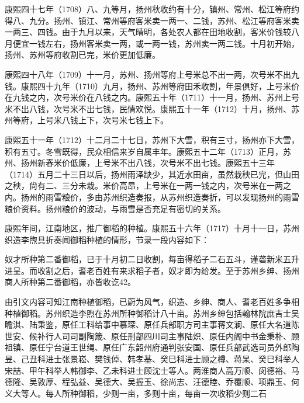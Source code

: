 康熙四十七年（1708）八、九等月，扬州秋收约有十分，镇州、常州、松江等府约得八、九分。扬州、镇江、常州等府客米卖一两一、二钱，苏州、松江等府客米卖一两三、四钱。由于九月以来，天气晴明，各处农人都在田地收割，客米价钱较八月便宜一钱左右，扬州客米卖一两，或一两一钱，苏州卖一两二钱。十月初开始，扬州、苏州等府收割已完，米价更加低廉。

\vfill
\begin{BookNotes}
\end{BookNotes}

康熙四十八年（1709）十一月，苏州、扬州等府上号米总不出一两，次号米不出九钱。康熙四十九年（1710）九月，扬州、苏州等府田禾收割，年景俱好，上号米价在九钱之内，次号米价在八钱之内。康熙五十年（1711）十一月，扬州、苏州上号米不出八钱，次号米不出七钱，民情欢悦。康熙五十一年（1712）十月，扬州、苏州等府，上号米八钱上下，次号米七钱上下。

康熙五十一年（1712）十二月二十七日，苏州下大雪，积有三寸，扬州亦下大雪，积有五寸。冬雪既得，民众相信来岁自属丰年。康熙五十二年（1713）正月，苏州、扬州新春米价低廉，上号米不出八钱，次号米不出七钱。康熙五十三年（1714）五月二十三日以后，扬州雨泽缺少，其近水田亩，虽然栽秧已完，但山田之秧，尙有二、三分未栽。米价高昂，上号米在一两一钱之内，次号米在一两之内。扬州的雨雪粮价，多由苏州织造奏报，从苏州织造奏折，可以发现扬州的雨雪粮价资料。扬州粮价的波动，与雨雪是否充足有密切的关系。

康熙年间，江南地区，推广御稻的种植。康熙五十六年（1717）十月十一日，苏州织造李煦具折奏闻御稻种植的情形，节录一段内容如下：

\begin{BookQuote}
奴才所种第二番御稻，已于十月初二日收割，每亩得稻子二石五斗，谨砻新米五升进呈。而收割之后，耆老百姓有来求稻子者，奴才即为给发。至于苏州乡绅、扬州商人所种第二番御稻，亦皆收讫42。
\end{BookQuote}

由引文内容可知江南种植御稻，已蔚为风气，织造、乡绅、商人、耆老百姓多争相种植御稻。苏州织造李煦在苏州所种御稻计八十亩。苏州乡绅包括翰林院庶吉士吴瞻淇、陆秉鉴，原任工科给事中慕琛、原任兵部职方司主事蒋文澜、原任大名道陈世安、候补行人司司副陶箴、原任刑部四川司主事陆炽、原任内阁中书金秉朴、顾祖镇、原任宁台道王世绳、原任广东韶州府通判张安国、原任兵部武选司员外郎陶昱、己丑科进士张景崧、樊钱倬、韩孝基、癸巳科进士顾之樽、蒋杲、癸巳科举人宋喆、甲午科举人韩御李、乙未科进士顾沈士等人。两淮商人高万顺、闵德裕、马德隆、吴敦厚、程弘益、吴德大、吴握玉、徐尚志、汪德睦、乔覆顺、项鼎玉、何义大等人。每人所种御稻，少则一亩，多则十亩，每亩一次收稻少则二石

